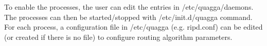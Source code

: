 To enable the processes, the user can edit the entries in /etc/quagga/daemons. \\
The processes can then be started/stopped with /etc/init.d/quagga {command}. \\
For each process, a configuration file in /etc/quagga (e.g. ripd.conf) can be edited (or created if there is no file) to configure routing algorithm parameters.
